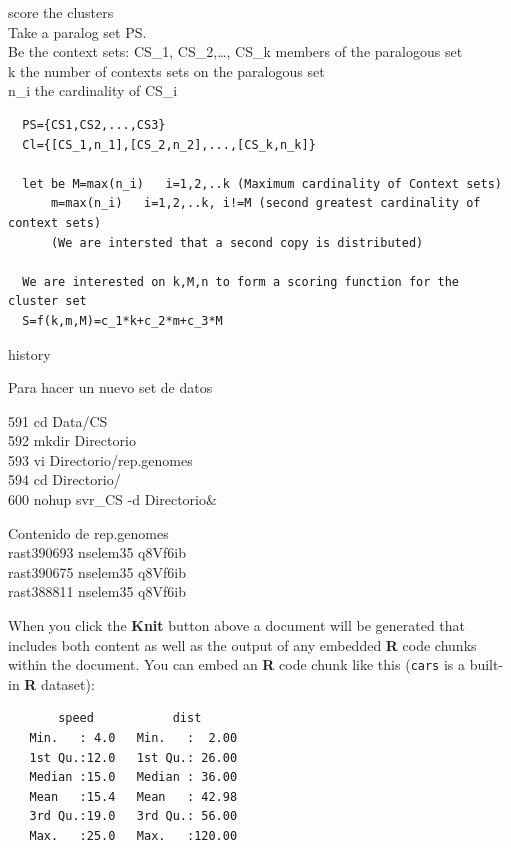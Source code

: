 \documentclass[12pt,twoside]{reedthesis}
\begin{document}
  score the clusters\\
  Take a paralog set PS.\\
  Be the context sets: CS\_1, CS\_2,\ldots{}, CS\_k members of the
  paralogous set\\
  k the number of contexts sets on the paralogous set\\
  n\_i the cardinality of CS\_i
  
  \begin{verbatim}
  PS={CS1,CS2,...,CS3}  
  Cl={[CS_1,n_1],[CS_2,n_2],...,[CS_k,n_k]}  
  
  let be M=max(n_i)   i=1,2,..k (Maximum cardinality of Context sets)  
      m=max(n_i)   i=1,2,..k, i!=M (second greatest cardinality of context sets)  
      (We are intersted that a second copy is distributed)  
  
  We are interested on k,M,n to form a scoring function for the cluster set  
  S=f(k,m,M)=c_1*k+c_2*m+c_3*M  
  \end{verbatim}
  
  history
  
  Para hacer un nuevo set de datos
  
  591 cd Data/CS\\
  592 mkdir Directorio\\
  593 vi Directorio/rep.genomes\\
  594 cd Directorio/\\
  600 nohup svr\_CS -d Directorio\&
  
  Contenido de rep.genomes\\
  rast\textbar{}390693 nselem35 q8Vf6ib\\
  rast\textbar{}390675 nselem35 q8Vf6ib\\
  rast\textbar{}388811 nselem35 q8Vf6ib
  
  When you click the \textbf{Knit} button above a document will be
  generated that includes both content as well as the output of any
  embedded \textbf{R} code chunks within the document. You can embed an
  \textbf{R} code chunk like this (\texttt{cars} is a built-in \textbf{R}
  dataset):
  
  \begin{Shaded}
  \begin{Highlighting}[]
  \end{Highlighting}
  \end{Shaded}
  
  \begin{verbatim}
       speed           dist       
   Min.   : 4.0   Min.   :  2.00  
   1st Qu.:12.0   1st Qu.: 26.00  
   Median :15.0   Median : 36.00  
   Mean   :15.4   Mean   : 42.98  
   3rd Qu.:19.0   3rd Qu.: 56.00  
   Max.   :25.0   Max.   :120.00  
  \end{verbatim}
  
\end{document}
